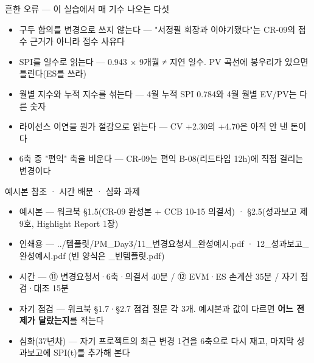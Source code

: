 \begin{frame}{흔한 오류 — 이 실습에서 매 기수 나오는 다섯}
\begin{itemize}
\item 구두 합의를 변경으로 쓰지 않는다 — "서정필 회장과 이야기됐다"는 CR-09의 접수 근거가 아니라 접수 사유다
\item SPI를 일수로 읽는다 — 0.943 × 9개월 ≠ 지연 일수. PV 곡선에 봉우리가 있으면 틀린다(ES를 쓰라)
\item 월별 지수와 누적 지수를 섞는다 — 4월 누적 SPI 0.784와 4월 월별 EV/PV는 다른 숫자
\item 라이선스 이연을 원가 절감으로 읽는다 — CV +2.30의 +4.70은 아직 안 낸 돈이다
\item 6축 중 "편익" 축을 비운다 — CR-09는 편익 B-08(리드타임 12h)에 직접 걸리는 변경이다
\end{itemize}
\end{frame}

\begin{frame}{예시본 참조 · 시간 배분 · 심화 과제}
\begin{itemize}
\item 예시본 — 워크북 §1.5(CR-09 완성본 + CCB 10-15 의결서) · §2.5(성과보고 제9호, Highlight Report 1장)
\item 인쇄용 — \textsf{../템플릿/PM\_Day3/11\_변경요청서\_완성예시.pdf} · \textsf{12\_성과보고\_완성예시.pdf} (빈 양식은 \textsf{\_빈템플릿.pdf})
\item 시간 — ⑪ 변경요청서·6축·의결서 40분 / ⑫ EVM·ES 손계산 35분 / 자기 점검·대조 15분
\item 자기 점검 — 워크북 §1.7·§2.7 점검 질문 각 3개. 예시본과 값이 다르면 \textbf{어느 전제가 달랐는지}를 적는다
\item 심화(3\til{}7년차) — 자기 프로젝트의 최근 변경 1건을 6축으로 다시 재고, 마지막 성과보고에 SPI(t)를 추가해 본다
\end{itemize}
\end{frame}

